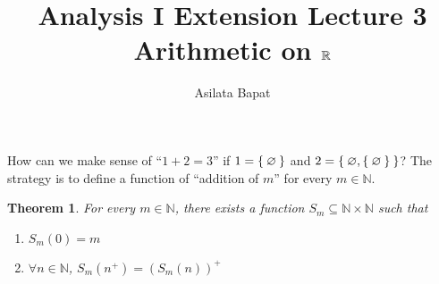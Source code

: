 \documentclass[12pt]{amsart}
\title{Analysis I Extension Lecture 3\\Arithmetic on $\mathbb{R}$}
\author{Asilata Bapat}
\newcommand{\bbN}{\mathbb{N}}
\theoremstyle{plain}
\newtheorem*{thm}{Theorem}
\theoremstyle{remark}
\theoremstyle{definition}
\begin{document}
\maketitle
{}

How can we make sense of ``$1+2 = 3$'' if $1 = \Set{\varnothing}$ and $2 = \Set{\varnothing, \Set{\varnothing}}$?
The strategy is to define a function of ``addition of $m$'' for every $m \in \bbN$. 

\begin{thm}
	For every $m \in \bbN$, there exists a function $S_m \subseteq \bbN \times \bbN$ such that 
	\begin{enumerate}[(1)]
		\item $S_m(0) = m$
		\item $\forall n \in \bbN$, $S_m(n^+) = (S_m(n))^+$
	\end{enumerate}
\end{thm}
\end{document}
